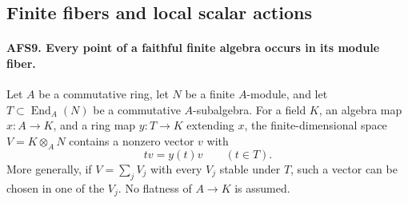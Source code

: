 \subsection{Finite fibers and local scalar actions}

\paragraph{AFS9. Every point of a faithful finite algebra occurs in its module fiber.}
\label{claim:AFS9}
Let $A$ be a commutative ring, let $N$ be a finite $A$-module,
and let $T\subset\operatorname{End}_A(N)$ be a commutative
$A$-subalgebra.  For a field $K$, an algebra map $x:A\to K$,
and a ring map $y:T\to K$ extending $x$, the finite-dimensional
space $V=K\otimes_A N$ contains a nonzero vector $v$ with
\[
             t v=y(t)v\qquad(t\in T).
\]
More generally, if $V=\sum_jV_j$ with every $V_j$ stable
under $T$, such a vector can be chosen in one of the $V_j$.
No flatness of $A\to K$ is assumed.
